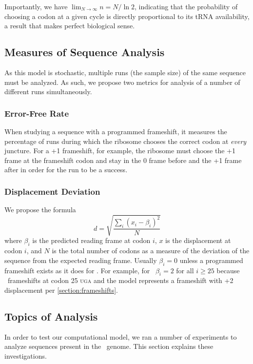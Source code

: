 \documentclass[12pt, draft]{article}
\numberwithin{equation}{section}
\begin{document}
Importantly, we have $\displaystyle\lim_{N\rightarrow\infty} n = N/\ln{2}$, indicating 
that the probability of choosing a codon at a given cycle is directly proportional 
to its tRNA availability, a result that makes perfect biological sense.

\subsection{Measures of Sequence Analysis}

As this model is stochastic, multiple runs (the sample size) of the same sequence must be analyzed.
As such, we propose two metrics for analysis of a number of different runs 
simultaneously. 

\subsubsection{Error-Free Rate}

When studying a
sequence with a programmed frameshift, it measures the percentage of runs 
during which the ribosome chooses the correct codon
at \emph{every} juncture.  For a +1 frameshift, for example, the ribosome must
choose the +1 frame at the frameshift codon and stay in the 0 frame before
and the +1 frame after in order for the run to be a success.

\subsubsection{Displacement Deviation}
\label{section:deviation}

We propose the formula
\begin{equation}
    \label{eqn:lbd}
    d = \sqrt{\frac{\sum_i \left(x_i - \beta_i\right)^2}{N}}
\end{equation}
where $\beta_i$ is the predicted reading frame at codon $i$, $x$ is the displacement at codon $i$,
and $N$ is the total number of codons as a measure of the deviation of the sequence
from the expected reading frame.  Usually $\beta_i = 0$ unless a
programmed frameshift exists as it does for \prfB.
For example, for \prfB\ $\beta_i = 2$ for all $i \geq 25$ because \prfB\ frameshifts at codon 25 \textsc{uga}
and the model represents a frameshift with +2 displacement per \autoref{section:frameshifts}.

\subsection{Topics of Analysis}
In order to test our computational model, we ran a number of
experiments to analyze sequences present in the \ecoli\ genome.  This
section explains these investigations.
\end{document}
